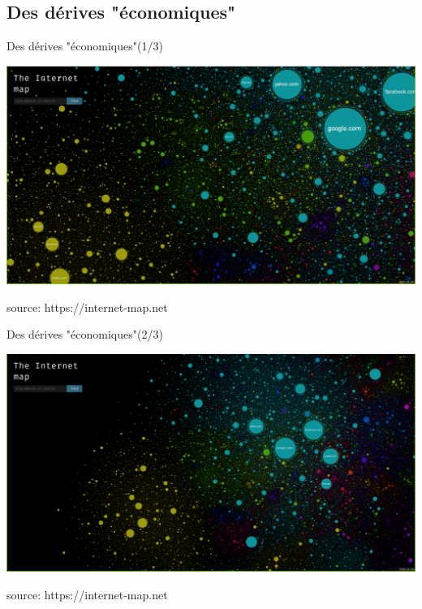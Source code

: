 \subsection{Des dérives "économiques"}

\begin{frame}{Des dérives "économiques"\hfill(1/3)}
  \begin{center}
    \includegraphics[width=1\textwidth]{usages/internet-map2.png}
  \end{center}
  \footnotesize{\tiny{source: https://internet-map.net}}
\end{frame}

\begin{frame}{Des dérives "économiques"\hfill(2/3)}
  \begin{center}
    \includegraphics[width=1\textwidth]{usages/internet-map1.png}
  \end{center}
  \footnotesize{\tiny{source: https://internet-map.net}}
\end{frame}


